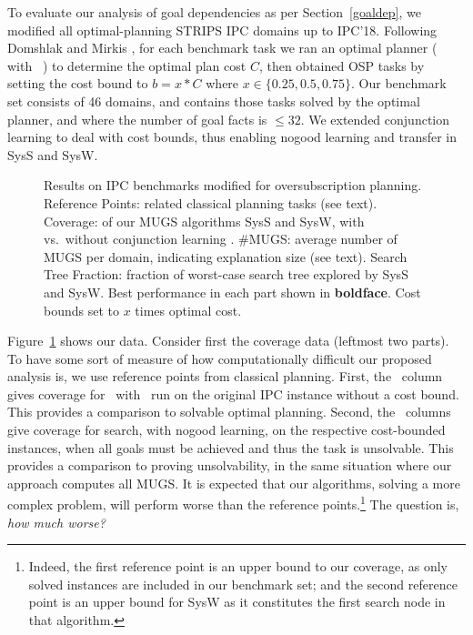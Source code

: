 To evaluate our analysis of goal dependencies as per
Section~\ref{goaldep}, we modified all optimal-planning STRIPS IPC
domains up to IPC'18. Following Domshlak and
Mirkis , for each benchmark task we
ran an optimal planner (\astar
with \hlmcut\ \cite{helmert:domshlak:icaps-09}) to determine the
optimal plan cost $C$, then obtained OSP tasks by setting the cost
bound to $b = x * C$ where $x \in \{0.25, 0.5, 0.75\}$. Our benchmark
set consists of 46 domains, and contains those tasks solved by the
optimal planner, and where the number of goal facts is $\leq 32$.
%
%
We extended conjunction learning \cite{steinmetz:hoffmann:ai-17} to
deal with cost bounds, thus enabling nogood learning and transfer in
SysS and SysW.


\setlength{\tabcolsep}{2pt}
\renewcommand{\arraystretch}{0.8}
\begin{figure}[h!]
	\tiny
	\centering  
        \vspace{-0.2cm}
	\caption{Results on IPC benchmarks modified for oversubscription planning. Reference Points: related classical planning tasks (see text). Coverage: of our MUGS algorithms SysS and SysW, with vs.\ without conjunction learning \hc. \#MUGS: average number of MUGS per domain, indicating explanation size (see text). Search Tree Fraction: fraction of worst-case search tree explored by SysS and SysW. Best performance in each part shown in \textbf{boldface}. Cost bounds set to $x$ times optimal cost.}
	\label{table:coverage_ipc}
        \vspace{-0.5cm}
\end{figure}

Figure~\ref{table:coverage_ipc} shows our data. Consider first the
coverage data (leftmost two parts). To have some sort of measure of
how computationally difficult our proposed analysis is, we use
reference points from classical planning. First, the \hlmcut\ column
gives coverage for \astar\ with \hlmcut\ run on the original IPC
instance without a cost bound. This provides a comparison to solvable
optimal planning. Second, the \hc\ columns give coverage for search,
with nogood learning, on the respective cost-bounded instances, when
all goals must be achieved and thus the task is unsolvable. This
provides a comparison to proving unsolvability, in the same situation
where our approach computes all MUGS.
%
It is expected that our algorithms, solving a more complex problem,
will perform worse than the reference points.\footnote{Indeed, the
first reference point is an upper bound to our coverage, as only
solved instances are included in our benchmark set; and the second
reference point is an upper bound for SysW as it constitutes the first
search node in that algorithm.} The question is, \emph{how much
worse?}

